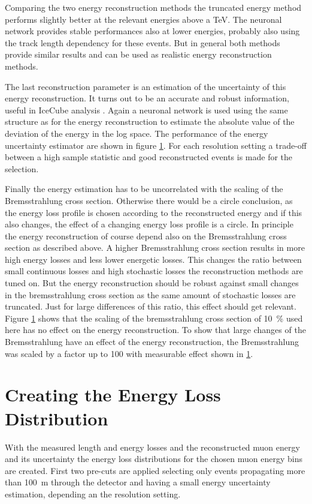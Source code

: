 Comparing the two energy reconstruction methods the truncated energy method performs slightly better at the relevant energies above a TeV.
The neuronal network provides stable performances also at lower energies, probably also using the track length dependency for these events.
But in general both methods provide similar results and can be used as realistic energy reconstruction methods.

The last reconstruction parameter is an estimation of the uncertainty of this energy reconstruction.
It turns out to be an accurate and robust information, useful in IceCube analysis \cite{mirco_icrc}.
Again a neuronal network is used using the same structure as for the energy reconstruction to estimate the absolute value of the deviation of the energy in the log space.
The performance of the energy uncertainty estimator are shown in figure \ref{}.
For each resolution setting a trade-off between a high sample statistic and good reconstructed events is made for the selection.

Finally the energy estimation has to be uncorrelated with the scaling of the Bremsstrahlung cross section.
Otherwise there would be a circle conclusion, as the energy loss profile is chosen according to the reconstructed energy and if this also changes, the effect of a changing energy loss profile is a circle.
In principle the energy reconstruction of course depend also on the Bremsstrahlung cross section as described above.
A higher Bremsstrahlung cross section results in more high energy losses and less lower energetic losses.
This changes the ratio between small continuous losses and high stochastic losses the reconstruction methods are tuned on.
But the energy reconstruction should be robust against small changes in the bremsstrahlung cross section  as the same amount of stochastic losses are truncated.
Just for large differences of this ratio, this effect should get relevant.
Figure \ref{} shows that the scaling of the bremsstrahlung cross section of \SI{10}{\percent} used here has no effect on the energy reconstruction.
To show that large changes of the Bremsstrahlung have an effect of the energy reconstruction, the Bremsstrahlung was scaled by a factor up to \num{100} with measurable effect shown in \ref{}.

\section{Creating the Energy Loss Distribution}

With the measured length and energy losses and the reconstructed muon energy and its uncertainty the energy loss distributions for the chosen muon energy bins are created.
First two pre-cuts are applied selecting only events propagating more than \SI{100}{m} through the detector and having a small energy uncertainty estimation, depending an the resolution setting.

